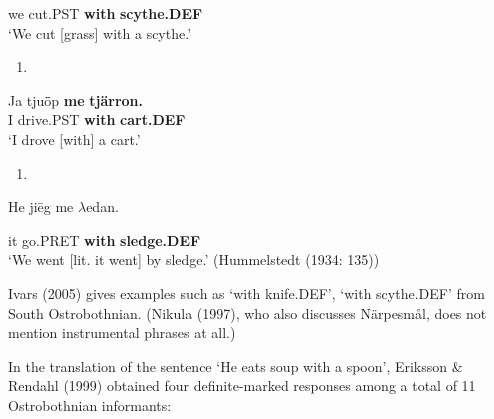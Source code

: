 we  cut.PST  \textbf{with} \textbf{scythe.DEF} \\ %


‘We cut [grass] with a scythe.’
\z


\begin{enumerate} %
\item 
\end{enumerate} %
\ea\label{}
\gll Ja  tju\={ö}p  \textbf{me} \textbf{tjärron.} \\


I  drive.PST  \textbf{with} \textbf{cart.DEF} \\ %


‘I drove [with] a cart.’ 
\z


\begin{enumerate} %
\item 
\end{enumerate} %
He  ji\=eg  me  $\lambda $edan.


it  go.PRET  \textbf{with} \textbf{sledge.DEF}\\ %


‘We went [lit. it went] by sledge.’ (Hummelstedt (1934: 135))
\z

Ivars (2005) gives examples such as  ‘with knife.DEF’,   ‘with scythe.DEF’ from South Ostrobothnian. (Nikula (1997), who also discusses Närpesmål, does not mention instrumental phrases at all.)

In the translation of the sentence ‘He eats soup with a spoon’, Eriksson \& Rendahl (1999) obtained four definite-marked responses among a total of 11 Ostrobothnian informants:


